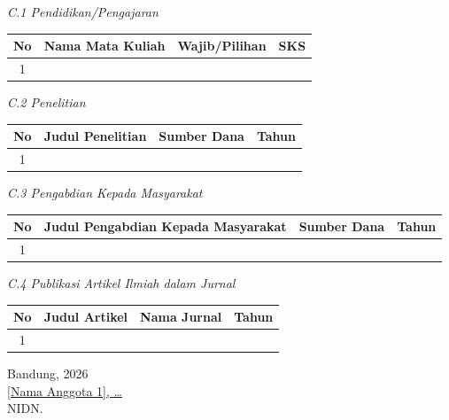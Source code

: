 \textit{C.1 Pendidikan/Pengajaran}
\begin{table}[h]
    \begin{tabularx}{\textwidth}{|c|X|X|c|}
        \hline
        \textbf{No} & \textbf{Nama Mata Kuliah} & \textbf{Wajib/Pilihan} & \textbf{SKS} \\ \hline
        1 & & & \\ \hline
    \end{tabularx}
\end{table}

\textit{C.2 Penelitian}
\begin{table}[h]
    \begin{tabularx}{\textwidth}{|c|X|X|c|}
        \hline
        \textbf{No} & \textbf{Judul Penelitian} & \textbf{Sumber Dana} & \textbf{Tahun} \\ \hline
        1 & & & \\ \hline
    \end{tabularx}
\end{table}

\textit{C.3 Pengabdian Kepada Masyarakat}
\begin{table}[h]
    \begin{tabularx}{\textwidth}{|c|X|X|c|}
        \hline
        \textbf{No} & \textbf{Judul Pengabdian Kepada Masyarakat} & \textbf{Sumber Dana} & \textbf{Tahun} \\ \hline
        1 & & & \\ \hline
    \end{tabularx}
\end{table}

\textit{C.4 Publikasi Artikel Ilmiah dalam Jurnal}
\begin{table}[h]
    \begin{tabularx}{\textwidth}{|c|X|X|c|}
        \hline
        \textbf{No} & \textbf{Judul Artikel} & \textbf{Nama Jurnal} & \textbf{Tahun} \\ \hline
        1 & & & \\ \hline
    \end{tabularx}
\end{table}

\vspace{1cm}
\begin{flushright}
    Bandung, \hspace{2cm} 2026\\[1cm]
    \underline{{[Nama Anggota 1]}, \ldots}\\
    NIDN.
\end{flushright}

